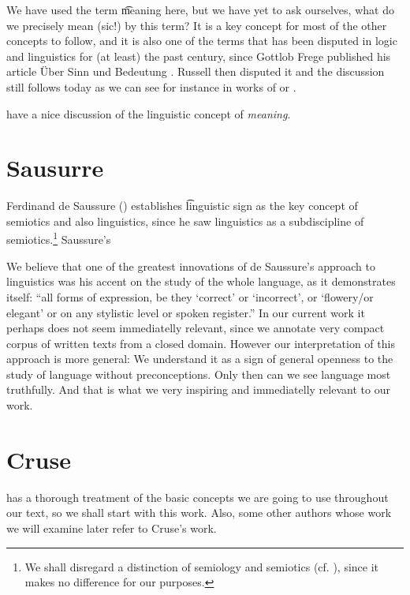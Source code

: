 We have used the term \t{meaning} here, but we have yet to ask ourselves, what do we precisely mean (sic!) by this term? It is a key concept for most of the other concepts to follow, and it is also one of the terms that has been disputed in logic and linguistics for (at least) the past century, since Gottlob Frege published his article Über Sinn und Bedeutung \citep{frege:1892}. Russell then disputed it and the discussion still follows today as we can see for instance in works of \citet{tichy:1978} or \citet{materna:1998}.

\citet{sgall-etal:1986} have a nice discussion of the linguistic concept of \emph{meaning}.   

\section{Sausurre}
Ferdinand de Saussure (\citeyear{saussure:2006}) establishes \t{linguistic sign} as the key concept of semiotics and also linguistics, since he saw linguistics as a subdiscipline of semiotics.\footnote{We shall disregard a distinction of semiology and semiotics (cf. \citealp{tobin:1990}), since it makes no difference for our purposes.} Saussure's 

We believe that one of the greatest innovations of de Saussure's approach to linguistics was his accent on the study of the whole language, as it demonstrates itself: ``all forms of expression, be they `correct' or `incorrect', or `flowery/or elegant' or on any stylistic level or spoken register.'' \citep{tobin:1990} In our current work it perhaps does not seem immediatelly relevant, since we annotate very compact corpus of written texts from a closed domain. However our interpretation of this approach is more general: We understand it as a sign of general openness to the study of language without preconceptions. Only then can we see language most truthfully. And that is what we very inspiring and immediatelly relevant to our work.


\section{Cruse}
\label{rel:cruse}
\citetext{D. A. Cruse in his book \emph{Lexical Semantics}, \citeyear{cruse:1986}} has a thorough treatment of the basic concepts we are going to use throughout our text, so we shall start with this work. Also, some other authors whose work we will examine later refer to Cruse's work. 

